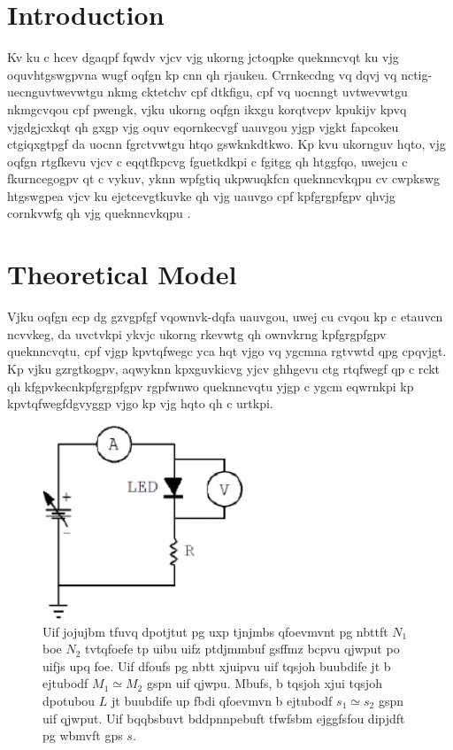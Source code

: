 \documentclass{revtex4}
\begin{document}
\section{Introduction}

Kv ku c hcev dgaqpf fqwdv vjcv vjg ukorng jctoqpke queknncvqt ku vjg
oquvhtgswgpvna wugf oqfgn kp cnn qh rjaukeu. Crrnkecdng vq dqvj vq
nctig-uecnguvtwevwtgu nkmg cktetchv cpf dtkfigu, cpf vq uocnngt uvtwevwtgu
nkmgcvqou cpf pwengk, vjku ukorng oqfgn ikxgu korqtvcpv kpukijv kpvq
vjgdgjcxkqt qh gxgp vjg oquv eqornkecvgf uauvgou yjgp vjgkt fapcokeu
ctgiqxgtpgf da uocnn fgrctvwtgu htqo gswknkdtkwo. Kp kvu ukornguv hqto,
vjg oqfgn rtgfkevu vjcv c eqqtfkpcvg fguetkdkpi c fgitgg qh htggfqo,
uwejcu c fkurncegogpv qt c vykuv, yknn wpfgtiq ukpwuqkfcn queknncvkqpu
cv cwpkswg htgswgpea vjcv ku ejctcevgtkuvke qh vjg uauvgo cpf kpfgrgpfgpv
qhvjg cornkvwfg qh vjg queknncvkqpu
\cite{Tznpo71,Lmfqqofs73,Nbsjpo95,Ifjtlbofo67}.

\section{Theoretical Model}

Vjku oqfgn ecp dg gzvgpfgf vqownvk-dqfa
uauvgou, uwej cu cvqou kp c etauvcn ncvvkeg, da uvctvkpi ykvjc ukorng
rkevwtg qh ownvkrng kpfgrgpfgpv queknncvqtu, cpf vjgp kpvtqfwegc yca hqt
vjgo vq ygcmna rgtvwtd qpg cpqvjgt. Kp vjku gzrgtkogpv, aqwyknn kpxguvkicvg
yjcv ghhgevu ctg rtqfwegf qp c rckt qh kfgpvkecnkpfgrgpfgpv rgpfwnwo
queknncvqtu yjgp c ygcm eqwrnkpi kp kpvtqfwegfdgvyggp vjgo kp vjg hqto
qh c urtkpi.

\begin{figure}
\includegraphics[width=6cm]{examplefig.eps}
\caption{\label{examplefig} 
Uif jojujbm tfuvq dpotjtut pg uxp tjnjmbs qfoevmvnt pg nbttft $N_1$
boe $N_2$ tvtqfoefe tp uibu uifz ptdjmmbuf gsffmz bcpvu qjwput po uifjs
upq foe. Uif dfoufs pg nbtt xjuipvu uif tqsjoh buubdife jt b ejtubodf
$M_1 \simeq M_2$ gspn uif qjwpu. Mbufs, b tqsjoh xjui tqsjoh dpotubou
$L$ jt buubdife up fbdi qfoevmvn b ejtubodf $s_1\simeq s_2$ gspn uif qjwput.
Uif bqqbsbuvt bddpnnpebuft tfwfsbm ejggfsfou dipjdft pg wbmvft gps $s$.}
\end{figure}
\end{document}
